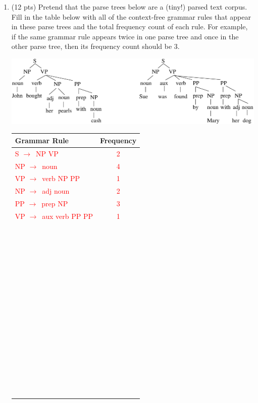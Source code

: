 \documentclass[11pt]{article}
\newcommand{\ra}{$\rightarrow$~}
\begin{document}
\begin{enumerate}
\begin{enumerate}
\end{enumerate}

\newpage
\item (12 pts) Pretend that the parse trees below are a (tiny!) parsed text
  corpus. Fill in the table below with all of the context-free grammar
  rules that appear in   these parse trees and the total frequency
  count of each rule. For example, if the same grammar rule appears
  twice in one parse tree and once in the other parse tree, then its
  frequency count should be 3. 

\begin{center}
\includegraphics[width=6.5in]{trees1.eps}
\end{center}

 \vspace*{.1in}
 \begin{center}
 \begin{tabular}{|l|c|}  \hline
 \textbf{Grammar Rule} & \textbf{Frequency} \\ \hline
 \textcolor{red}{S \ra NP VP}& \textcolor{red}{2} \\
 \textcolor{red}{NP \ra noun} & \textcolor{red}{4} \\
 \textcolor{red}{VP \ra verb NP PP} & \textcolor{red}{1}  \\
 \textcolor{red}{NP \ra adj noun} & \textcolor{red}{2}\\
 \textcolor{red}{PP \ra prep NP}& \textcolor{red}{3} \\
 \textcolor{red}{VP \ra aux verb PP PP} & \textcolor{red}{1} \\
~ & ~ \\
~ & ~ \\
~ & ~ \\
~ & ~ \\
~ & ~ \\
~ & ~ \\
~ & ~ \\
~ & ~ \\
~ & ~ \\
~ & ~ \\
~ & ~ \\
~ & ~ \\
~ & ~ \\
~ & ~ \\ \hline
 \end{tabular}
 \end{center}




\end{enumerate}
\end{document}
